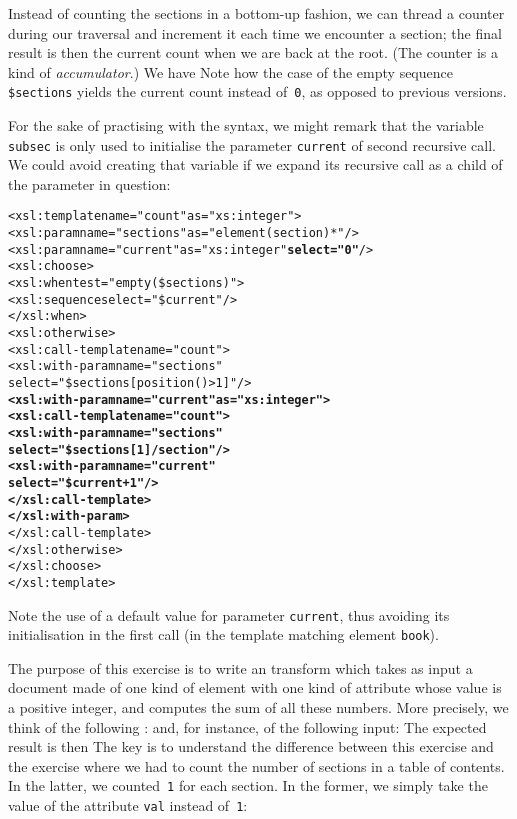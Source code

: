 Instead of counting the sections in a bottom\hyp{}up fashion, we can
thread a counter during our traversal and increment it each time we
encounter a section; the final result is then the current count when
we are back at the root. (The counter is a kind of
\emph{accumulator}.) We have
\noindent Note how the case of the empty sequence \texttt{\$sections}
yields the current count instead of~\texttt{0}, as opposed to
previous versions.

For the sake of practising with the \XSLT syntax, we might remark that
the variable \texttt{subsec} is only used to initialise the parameter
\texttt{current} of second recursive call. We could avoid creating that
variable if we expand its recursive call as a child of the parameter
in question:
\begin{alltt}
  <xsl:template name="count" as="xs:integer">
    <xsl:param name="sections" as="element(section)*"/>
    <xsl:param name="current"  as="xs:integer" \textbf{select="0"}/>
    <xsl:choose>
      <xsl:when test="empty(\$sections)">
        <xsl:sequence select="\$current"/>
      </xsl:when>
      <xsl:otherwise>
        <xsl:call-template name="count">
          <xsl:with-param name="sections"
                          select="\$sections[position()>1]"/>
          \textbf{<xsl:with-param name="current" as="xs:integer">
            <xsl:call-template name="count">
              <xsl:with-param name="sections"
                              select="\$sections[1]/section"/>
              <xsl:with-param name="current"
                              select="\$current + 1"/>
            </xsl:call-template>
          </xsl:with-param>}
        </xsl:call-template>
      </xsl:otherwise>
    </xsl:choose>
  </xsl:template>
\end{alltt}
Note the use of a default value for parameter \texttt{current}, thus
avoiding its initialisation in the first call (in the template
matching element \texttt{book}).


The purpose of this exercise is to write an \XSLT transform which
takes as input a document made of one kind of element with one kind of
attribute whose value is a positive integer, and computes the sum of
all these numbers. More precisely, we think of the following \DTD:
\noindent and, for instance, of the following input:
\noindent The expected result is then
The key is to understand the difference between this exercise and the
exercise where we had to count the number of sections in a table of
contents. In the latter, we counted~\texttt{1} for each section. In
the former, we simply take the value of the attribute \texttt{val}
instead of~\texttt{1}:

